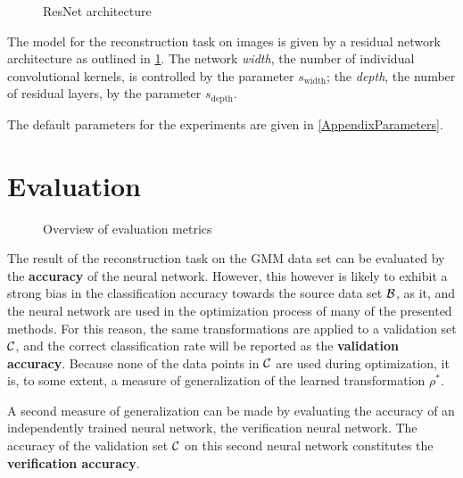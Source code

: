 \begin{figure}[!ht]
\begin{minipage}{0.5\textwidth}
\centering

\end{minipage}
\begin{minipage}{0.5\textwidth}
\centering

\end{minipage}
\caption{ResNet architecture}
\label{fig:resnet}
\end{figure}

The model for the reconstruction task on images is given by a residual network architecture
as outlined in \cref{fig:resnet}. 
The network \textit{width}, the number of individual convolutional kernels, is controlled by the parameter $s_\text{width}$; the \textit{depth}, the number of residual layers, by the parameter
$s_\text{depth}$.

The default parameters for the experiments are given in \cref{AppendixParameters}.




\section{Evaluation}
\label{sec:evaluation}

\begin{figure}[ht]
    \centering
    
    \caption{Overview of evaluation metrics}
    \label{fig:evaluation_overview}
    \centering
\end{figure}

The result of the reconstruction task on the GMM data set can be evaluated by the \textbf{accuracy}
of the neural network. However, this however is likely to exhibit a strong bias in the classification accuracy 
towards the source data set $\mathcal B$, as it, and 
the neural network 
are used in the optimization process
of many of the presented methods.
For this reason, the same transformations are applied to
a validation set $\mathcal C$, and the 
correct classification rate will be reported as the \textbf{validation accuracy}. 
Because none of the data points in $\mathcal C$
are used during optimization, it is, to some extent, a measure of generalization
of the learned transformation $\rho^*$.

A second measure of generalization can be made by evaluating the accuracy of an
independently trained neural network, the verification neural network.
The accuracy of the validation set $\mathcal C$ on this second neural network 
constitutes the \textbf{verification accuracy}.

